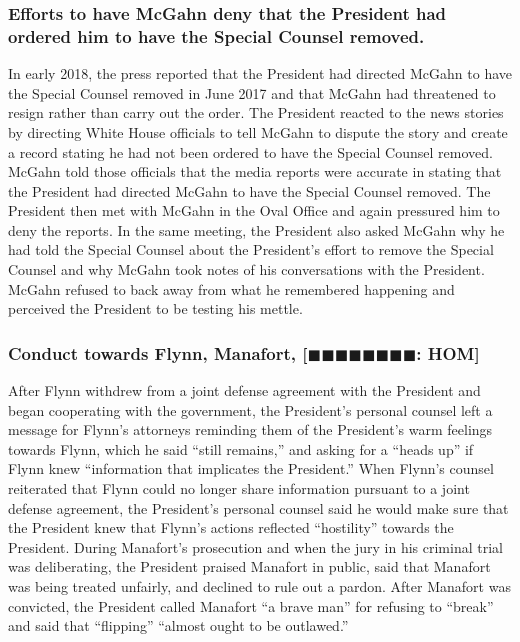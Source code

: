 \subsubsection*{Efforts to have McGahn deny that the President had ordered him to have the Special Counsel removed.}

In early 2018, the press reported that the President had directed McGahn to have the Special Counsel removed in June 2017 and that McGahn had threatened to resign rather than carry out the order.
The President reacted to the news stories by directing White House officials to tell McGahn to dispute the story and create a record stating he had not been ordered to have the Special Counsel removed.
McGahn told those officials that the media reports were accurate in stating that the President had directed McGahn to have the Special Counsel removed.
The President then met with McGahn in the Oval Office and again pressured him to deny the reports.
In the same meeting, the President also asked McGahn why he had told the Special Counsel about the President's effort to remove the Special Counsel and why McGahn took notes of his conversations with the President.
McGahn refused to back away from what he remembered happening and perceived the President to be testing his mettle.

\subsubsection*{Conduct towards Flynn, Manafort, [$\blacksquare\blacksquare\blacksquare\blacksquare\blacksquare\blacksquare\blacksquare\blacksquare$: HOM]}

After Flynn withdrew from a joint defense agreement with the President and began cooperating with the government, the President's personal counsel left a message for Flynn's attorneys reminding them of the President's warm feelings towards Flynn, which he said ``still remains,'' and asking for a ``heads up'' if Flynn knew ``information that implicates the President.''
When Flynn's counsel reiterated that Flynn could no longer share information pursuant to a joint defense agreement, the President's personal counsel said he would make sure that the President knew that Flynn's actions reflected ``hostility'' towards the President.
During Manafort's prosecution and when the jury in his criminal trial was deliberating, the President praised Manafort in public, said that Manafort was being treated unfairly, and declined to rule out a pardon.
After Manafort was convicted, the President called Manafort ``a brave man'' for refusing to ``break'' and said that ``flipping'' ``almost ought to be outlawed.''

